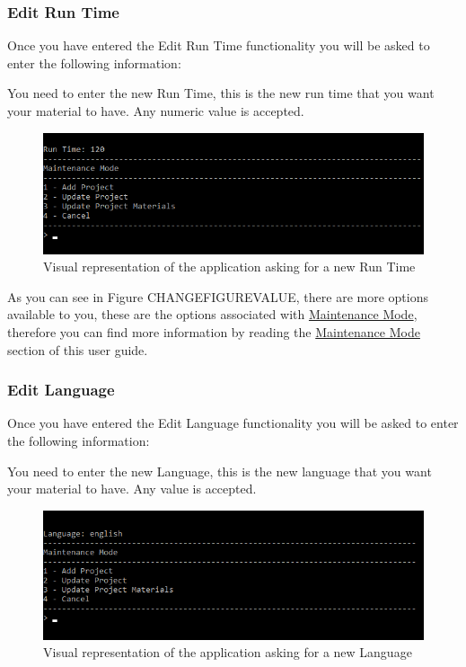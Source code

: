 \documentclass[
  english,
  a4paper,
,tablecaptionabove
]{scrartcl}
\begin{document}
\newpage

\hypertarget{edit-run-time-1}{%
\subsubsection{Edit Run Time}\label{edit-run-time-1}}

Once you have entered the Edit Run Time functionality you will be asked
to enter the following information:

You need to enter the new Run Time, this is the new run time that you
want your material to have. Any numeric value is accepted.

\begin{figure}
\centering
\includegraphics{images/user-guide/maintenance-mode/update-project-material-run-time.png}
\caption{Visual representation of the application asking for a new Run
Time}
\end{figure}

As you can see in Figure CHANGEFIGUREVALUE, there are more options
available to you, these are the options associated with
\protect\hyperlink{using-maintenance-mode}{Maintenance Mode}, therefore
you can find more information by reading the
\protect\hyperlink{using-maintenance-mode}{Maintenance Mode} section of
this user guide.

\newpage

\hypertarget{edit-language-1}{%
\subsubsection{Edit Language}\label{edit-language-1}}

Once you have entered the Edit Language functionality you will be asked
to enter the following information:

You need to enter the new Language, this is the new language that you
want your material to have. Any value is accepted.

\begin{figure}
\centering
\includegraphics{images/user-guide/maintenance-mode/update-project-material-language.png}
\caption{Visual representation of the application asking for a new
Language}
\end{figure}
\end{document}
